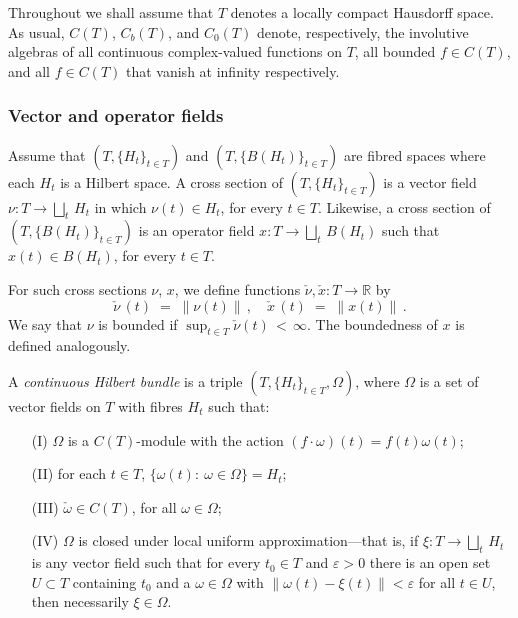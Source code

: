 \documentclass{amsart}
\theoremstyle{definition}
\theoremstyle{remark}
\begin{document}
 
 

Throughout we shall assume that $T$ denotes a locally compact Hausdorff space.
As usual,
$C(T)$, $C_b(T)$, and $C_0(T)$ denote, respectively, the involutive algebras
of all continuous complex-valued functions on $T$, all bounded $f\in C(T)$, and all
$f\in C(T)$ that vanish at infinity respectively.

\subsubsection*{Vector and operator fields}

Assume that 
$(T, \{H_t\}_{t\in T})$ and $(T, \{B(H_t)\}_{t\in T})$ are fibred spaces 
where each $H_t$ is a Hilbert space.
A cross section of $(T, \{H_t\}_{t\in T})$ is a vector field
$\nu:T\rightarrow \bigsqcup_t\,H_t$ in which $\nu(t)\in H_t$,
for every $t\in T$.  Likewise, a cross section of 
$(T, \{B(H_t)\}_{t\in T})$ is an operator field
$x:T\rightarrow \bigsqcup_t\,B(H_t)$ such that $x(t)\in B(H_t)$,
for every $t\in T$.

For such cross sections $\nu$, $x$, we define functions $\check{\nu},\check{x}:T\rightarrow\mathbb R$ by
\[
\check{\nu}\,(t)\;=\;\|\nu(t)\|\,,\quad \check{x}\,(t)\;=\;\|x(t)\|\,.
\]
We say that $\nu$ is bounded if $\sup_{t\in T}\check{\nu}(t)\,<\,\infty$.
The boundedness of $x$ is defined analogously.

A {\em continuous Hilbert bundle} \cite{dixmier--douady1963} is a triple $(T,\{H_t\}_{t\in T},\Omega)$,
where
$\Omega$ is a set of vector fields on $T$ with fibres $H_t$
such that:
\begin{enumerate}
\item[{(I)}] $\Omega$ is a $C(T)$-module with the action $(f\cdot\omega)(t)=f(t)\omega(t)$;
\item[{(II)}] for each $t\in T$, $\{\omega(t):\ \omega\in \Omega\}=H_{t}$;
\item[{(III)}] $\check{\omega}\in C(T)$, for all $\omega\in\Omega$;
\item[{(IV)}] $\Omega$ is closed under local uniform approximation---that is, if $\xi:T\rightarrow
                \bigsqcup_t\,H_t$
                is any vector field such that for every $t_0\in T$ and $\varepsilon>0$ there is an
                open set $U\subset T$
                containing $t_0$ and a $\omega\in \Omega$ with $\|\omega(t)-\xi(t)\|<\varepsilon$
                for all $t\in U$, then necessarily $\xi\in\Omega$.
\end{enumerate}
\end{document}
